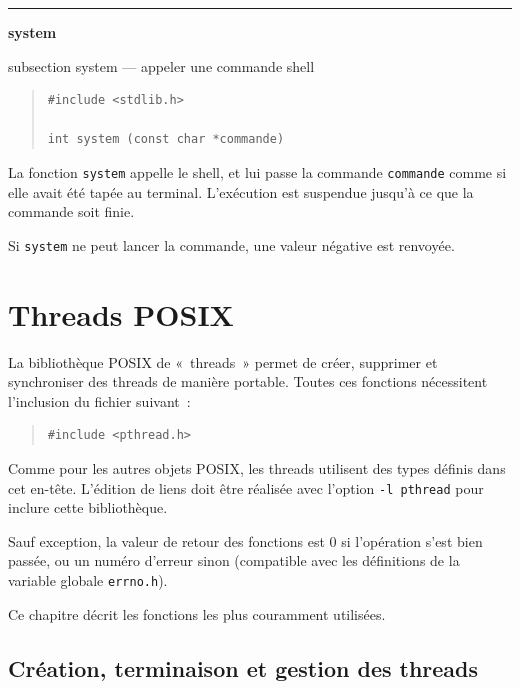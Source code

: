 \documentclass [twoside] {report}
\newcommand {\primitive} [1]
    {
	\phantomsection
	{\large \textbf {#1}}
	\addcontentsline {toc} {subsection} {#1}
    }
\newcommand {\separation}
    {
	\vspace {5mm}
	\nopagebreak
	\hrule
    }
\begin{document}
\separation 
\primitive {system} --- appeler une commande shell

\begin {quote}
\begin {verbatim}
#include <stdlib.h>

int system (const char *commande)
\end{verbatim}
\end {quote}

La fonction \texttt {system} appelle le shell, et lui passe la
commande \texttt {commande} comme si elle avait été tapée au
terminal. L'exécution est suspendue jusqu'à ce que la
commande soit finie.

Si \texttt {system} ne peut lancer la commande, une valeur
négative est renvoyée.




\cleardoublepage
\chapter {Threads POSIX}

La bibliothèque POSIX de «~threads~» permet de créer, supprimer et
synchroniser des threads de manière portable. Toutes ces fonctions
nécessitent l'inclusion du fichier suivant~:

\begin {quote}
\begin {verbatim}
#include <pthread.h>
\end{verbatim}
\end {quote}

Comme pour les autres objets POSIX, les threads utilisent des types
définis dans cet en-tête. L'édition de liens doit être réalisée avec
l'option \verb|-l pthread| pour inclure cette bibliothèque.

Sauf exception, la valeur de retour des fonctions est 0 si l'opération
s'est bien passée, ou un numéro d'erreur sinon (compatible avec les
définitions de la variable globale \texttt {errno.h}).

Ce chapitre décrit les fonctions les plus couramment utilisées.


\section {Création, terminaison et gestion des threads}
\end{document}
